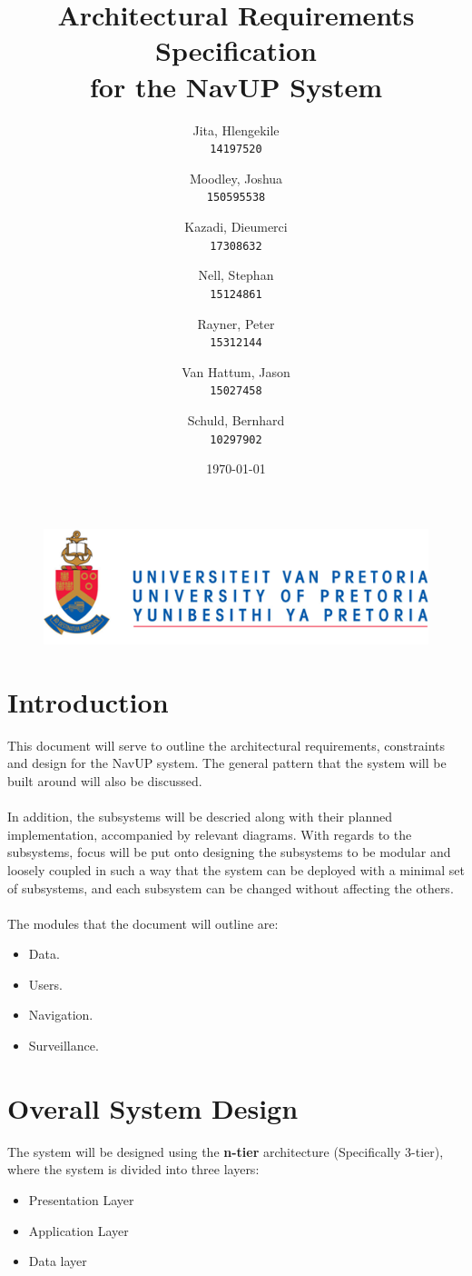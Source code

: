 \documentclass[english]{article}
\author{
	Jita, Hlengekile\\
	\texttt{14197520}
	\and
	Moodley, Joshua\\
	\texttt{150595538}
	\and
	Kazadi, Dieumerci\\
	\texttt{17308632}
	\and
	Nell, Stephan\\
	\texttt{15124861}
	\and
	Rayner, Peter\\
	\texttt{15312144}
	\and
	Van Hattum, Jason\\
	\texttt{15027458}
	\and
	Schuld, Bernhard\\
	\texttt{10297902}
}
\title{Architectural Requirements Specification\\
	for the NavUP System\\
	}
\date{\today}
\begin{document}
    \fboxsep=2mm

	\maketitle
	\begin{figure}[!t]
		\includegraphics{up_logo.png}
	\end{figure}
	\newpage

	\tableofcontents
	\newpage



	\section{Introduction}
	
		This document will serve to outline the architectural requirements, constraints and design for the NavUP system. The general pattern that the system will be built around will also be discussed.\\
        \\
		In addition, the subsystems will be descried along with their planned implementation, accompanied by relevant diagrams. With regards to the subsystems, focus will be put onto designing the subsystems to be modular and loosely coupled in such a way that the system can be deployed with a minimal set of subsystems, and each subsystem can be changed without affecting the others.\\
		\\
		The modules that the document will outline are:
		\begin{itemize}
		    \item Data.
		    \item Users.
		    \item Navigation.
		    \item Surveillance.
		\end{itemize}

	\section{Overall System Design}
	    The system will be designed using the \textbf{n-tier} architecture (Specifically 3-tier), where the system is divided into three layers:
	    \begin{itemize}
	        \item Presentation Layer
	        \item Application Layer
	        \item Data layer
	    \end{itemize}
\end{document}
